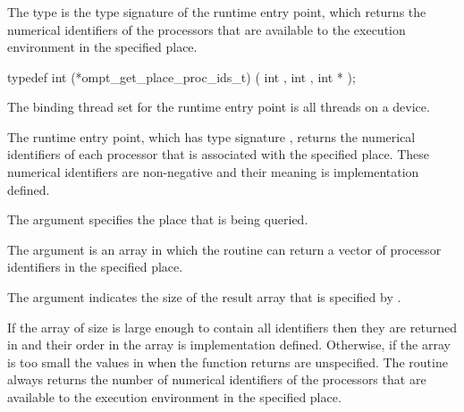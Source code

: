 \subsubsection{}
\label{sec:ompt_get_place_proc_ids_t}
\label{sec:ompt_get_place_proc_ids}

\summary
The  type is the type signature of the 
 runtime entry point, which returns the
numerical identifiers of the processors that are available to the execution 
environment in the specified place.

\format
\begin{ccppspecific}
\begin{omptInquiry}
typedef int (*ompt_get_place_proc_ids_t) (
  int ,
  int ,
  int *
);
\end{omptInquiry}
\end{ccppspecific}

\binding
The binding thread set for the  runtime 
entry point is all threads on a device.

\descr
The  runtime entry point, which has type 
signature , returns the numerical 
identifiers of each processor that is associated with the specified 
place. These numerical identifiers are non-negative and their meaning 
is implementation defined.

\argdesc
The  argument specifies the place that is being queried.

The  argument is an array in which the routine can return
a vector of processor identifiers in the specified place.

The  argument indicates the size of the result array that
is specified by .

\effect
If the  array of size  is large enough to contain 
all identifiers then they are returned in  and their order in the 
array is implementation defined. Otherwise, if the  array is too 
small the values in  when the function returns are unspecified.
The routine always returns the number of numerical identifiers of the 
processors that are available to the execution environment in the specified place.



\subsubsection{}
\label{sec:ompt_get_place_num_t}
\label{sec:ompt_get_place_num}

